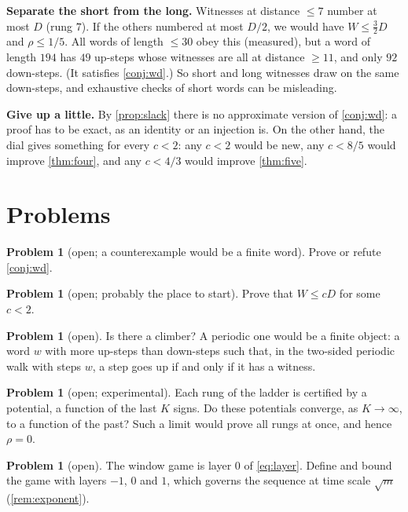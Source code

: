 \documentclass[11pt]{amsart}
\theoremstyle{definition}
\newtheorem{problem}[theorem]{Problem}
\begin{document}
\medskip\noindent\textbf{Separate the short from the long.} Witnesses at distance $\le7$ number at most $D$ (rung $7$). If the others
numbered at most $D/2$, we would have $W\le\frac32D$ and $\rho\le1/5$. All words of length $\le30$ obey this (measured), but a word of length $194$ has $49$ up-steps whose witnesses are
all at distance $\ge11$, and only $92$ down-steps. (It satisfies \cref{conj:wd}.) So short and long witnesses draw on the same
down-steps, and exhaustive checks of short words can be misleading.

\medskip\noindent\textbf{Give up a little.} By \cref{prop:slack} there is no approximate version of \cref{conj:wd}: a proof has to be exact, as an identity or an injection is. On the other hand, the dial gives something for every
$c<2$: any $c<2$ would be new, any $c<8/5$ would improve \cref{thm:four}, and any $c<4/3$ would improve \cref{thm:five}.

\section{Problems}\label{sec:problems}

\begin{problem}[open; a counterexample would be a finite word]\label{prob:wd}
Prove or refute \cref{conj:wd}.
\end{problem}

\begin{problem}[open; probably the place to start]
Prove that $W\le cD$ for some $c<2$.
\end{problem}

\begin{problem}[open]
Is there a climber? A periodic one would be a finite object: a word $w$ with more up-steps than
down-steps such that, in the two-sided periodic walk with steps $w$, a step goes up if and only if it has a witness.
\end{problem}

\begin{problem}[open; experimental]
Each rung of the ladder is certified by a potential, a function of the last $K$ signs. Do these potentials converge, as
$K\to\infty$, to a function of the past? Such a limit would prove all rungs at once, and hence $\rho=0$.
\end{problem}

\begin{problem}[open]
The window game is layer $0$ of \eqref{eq:layer}. Define and bound the game with layers $-1$, $0$ and $1$, which governs the sequence
at time scale $\sqrt m$ (\cref{rem:exponent}).
\end{problem}
\end{document}
